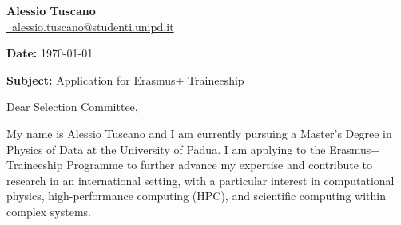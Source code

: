 \documentclass[a4paper,11pt]{article}
\begin{document}
\begin{flushright}
\textbf{Alessio Tuscano}\\
\href{mailto:alessio.tuscano@studenti.unipd.it}{\raisebox{-0.05\height}\faEnvelope \ alessio.tuscano@studenti.unipd.it} \\
\end{flushright}

\vspace{.5em}
\noindent
\textbf{Date:} \today

\vspace{.5em}
\noindent
\textbf{Subject:} Application for Erasmus+ Traineeship

\vspace{1em}
\noindent
Dear Selection Committee,

My name is Alessio Tuscano and I am currently pursuing a Master’s Degree in Physics of Data at the University of Padua. I am applying to the Erasmus+ Traineeship Programme to further advance my expertise and contribute to research in an international setting, with a particular interest in computational physics, high-performance computing (HPC), and scientific computing within complex systems.


\end{document}
